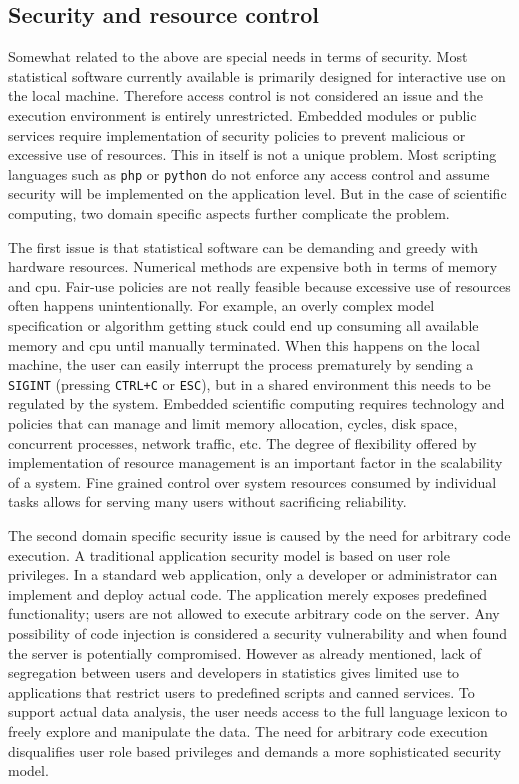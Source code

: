 \subsection{Security and resource control}

Somewhat related to the above are special needs in terms of security. Most statistical software currently available is primarily designed for interactive use on the local machine. Therefore access control is not considered an issue and the execution environment is entirely unrestricted. Embedded modules or public services require implementation of security policies to prevent malicious or excessive use of resources. This in itself is not a unique problem. Most scripting languages such as \texttt{php} or \texttt{python} do not enforce any access control and assume security will be implemented on the application level. But in the case of scientific computing, two domain specific aspects further complicate the problem. 

The first issue is that statistical software can be demanding and greedy with hardware resources. Numerical methods are expensive both in terms of memory and cpu. Fair-use policies are not really feasible because excessive use of resources often happens unintentionally. For example, an overly complex model specification or algorithm getting stuck could end up consuming all available memory and cpu until manually terminated. When this happens on the local machine, the user can easily interrupt the process prematurely by sending a \texttt{SIGINT} (pressing \texttt{CTRL+C} or \texttt{ESC}), but in a shared environment this needs to be regulated by the system. Embedded scientific computing requires technology and policies that can manage and limit memory allocation, cycles, disk space, concurrent processes, network traffic, etc. The degree of flexibility offered by implementation of resource management is an important factor in the scalability of a system. Fine grained control over system resources consumed by individual tasks allows for serving many users without sacrificing reliability. 

The second domain specific security issue is caused by the need for arbitrary code execution. A traditional application security model is based on user role privileges. In a standard web application, only a developer or administrator can implement and deploy actual code. The application merely exposes predefined functionality; users are not allowed to execute arbitrary code on the server. Any possibility of code injection is considered a security vulnerability and when found the server is potentially compromised. However as already mentioned, lack of segregation between users and developers in statistics gives limited use to applications that restrict users to predefined scripts and canned services. To support actual data analysis, the user needs access to the full language lexicon to freely explore and manipulate the data. The need for arbitrary code execution disqualifies user role based privileges and demands a more sophisticated security model. 


